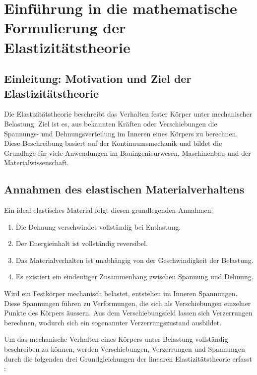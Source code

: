 %
%
%
%
\section{Einführung in die mathematische Formulierung der Elastizitätstheorie}

\subsection{Einleitung: Motivation und Ziel der Elastizitätstheorie}

Die Elastizitätstheorie beschreibt das Verhalten fester Körper unter mechanischer Belastung. Ziel ist es, aus bekannten Kräften oder Verschiebungen die Spannungs- und Dehnungsverteilung im Inneren eines Körpers zu berechnen. Diese Beschreibung basiert auf der Kontinuumsmechanik und bildet die Grundlage für viele Anwendungen im Bauingenieurwesen, Maschinenbau und der Materialwissenschaft.

\subsection{Annahmen des elastischen Materialverhaltens}

Ein ideal elastisches Material folgt diesen grundlegenden Annahmen:

\begin{enumerate}
	\item Die Dehnung verschwindet vollständig bei Entlastung.
	\item Der Energieinhalt ist vollständig reversibel.
	\item Das Materialverhalten ist unabhängig von der Geschwindigkeit der Belastung.
	\item Es existiert ein eindeutiger Zusammenhang zwischen Spannung und Dehnung.
\end{enumerate}

Wird ein Festkörper mechanisch belastet, entstehen im Inneren Spannungen. Diese Spannungen führen zu Verformungen, die sich als Verschiebungen einzelner Punkte des Körpers äussern.
Aus dem Verschiebungsfeld lassen sich Verzerrungen berechnen, wodurch sich ein sogenannter Verzerrungszustand ausbildet.

Um das mechanische Verhalten eines Körpers unter Belastung vollständig beschreiben zu können, werden Verschiebungen, Verzerrungen und Spannungen durch die folgenden drei Grundgleichungen der linearen Elastizitätstheorie erfasst \cite{elastomechanik:Technische_Mechanik_2:Elastostatik}:

